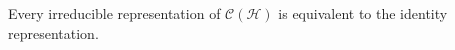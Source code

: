 Every irreducible representation of $\mathcal{C}(\mathcal{H})$ is equivalent to the identity representation.
